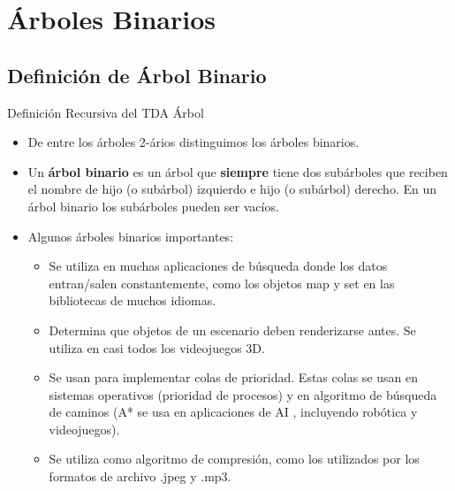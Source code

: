 \documentclass[10pt,envcountsect,spanish]{beamer}
\begin{document}
\section{Árboles Binarios}



\subsection{Definición de Árbol Binario}

\begin{frame}{Definición Recursiva del TDA Árbol}

\begin{itemize}%

\item De entre los árboles 2-ários distinguimos los árboles binarios. 

\item {}

Un \textbf{árbol binario} es un árbol que \textbf{siempre} tiene dos subárboles que reciben el nombre de hijo (o subárbol) izquierdo e hijo (o subárbol) derecho. En un árbol binario los subárboles pueden ser vacíos.


\item Algunos árboles binarios importantes:
\begin{itemize}
\item 
{} Se utiliza en muchas aplicaciones de búsqueda donde los datos entran/salen constantemente, como los objetos map y set en las bibliotecas de muchos idiomas.

\item 
{} Determina que objetos de un escenario deben renderizarse antes. Se utiliza en casi todos los videojuegos 3D.

\item
{} Se usan para implementar colas de prioridad. Estas colas se usan en sistemas operativos (prioridad de procesos) y en algoritmo de búsqueda de caminos (A* se usa en aplicaciones de AI , incluyendo robótica y videojuegos).

\item
{}  Se utiliza como algoritmo de compresión, como los utilizados por los formatos de archivo .jpeg y .mp3.
\end{itemize}

\end{itemize}

\end{frame}
\end{document}

